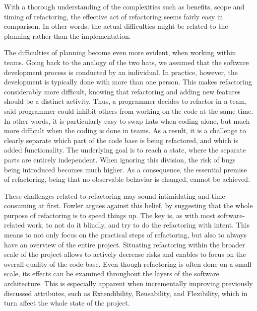 

With a thorough understanding of the complexities 
	such as benefits, scope and timing of refactoring, 
	the effective act of refactoring seems fairly easy in comparison. 
In other words, 
	the actual difficulties
	might be related to the planning rather than the implementation. 

The difficulties of planning become even more evident,
	when working within teams.
Going back to the analogy of the two hats, 
	we assumed that the software development process 
	is conducted by an individual. 
In practice, however, 
	the development is typically done with more than one person. 
 This makes refactoring considerably more difficult,
 	knowing that refactoring and adding new features 
	should be a distinct activity. 
Thus, a programmer decides to refactor in a team,
	said programmer could inhibit others from working on the code 
	at the same time. 
In other words, it is particularly easy to swap hats when coding alone, 
	but much more difficult when the coding is done in teams. 
As a result, 
	it is a challenge to clearly separate 
	which part of the code base is being refactored, 
	and which is added functionality. 
The underlying goal is to reach a state,
	where the separate parts are entirely independent. 
When ignoring this division, 
	the risk of bugs being introduced becomes much higher. 
As a consequence, 
	the essential premise of refactoring, 
	being that no observable behavior is changed, 
	cannot be achieved.

These challenges related to refactoring 
	may sound intimidating and time-consuming at first.
Fowler \textcite[p.~56]{fowler2018} argues against this belief,
	by suggesting that the whole purpose of refactoring 
	is to speed things up.
The key is, as with most software-related work, to not do it blindly, 
	and try to do the refactoring with intent.
 This means to not only focus on the practical steps of refactoring,
 	but also to always have an overview of the entire project.
Situating refactoring within the broader scale of the project 
	allows to actively decrease risks and 
    enables to focus on the overall quality of the code base.
Even though refactoring is often done on a small scale,
	its effects can be examined 
	throughout the layers of the software architecture.
This is especially apparent when incrementally improving previously discussed attributes,
	such as Extendibility, Reusability, and Flexibility, 
	which in turn affect the whole state of the project. 

